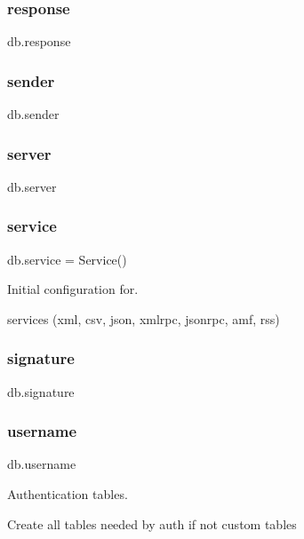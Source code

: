 \subsubsection{\texorpdfstring{response}{response}}
{\footnotesize\ttfamily db.\+response}

\mbox{\label{namespacedb_a0389358465df21506bd70f938441160f}} 
\subsubsection{\texorpdfstring{sender}{sender}}
{\footnotesize\ttfamily db.\+sender}

\mbox{\label{namespacedb_a83850ad9c01b1355d91e442407781570}} 
\subsubsection{\texorpdfstring{server}{server}}
{\footnotesize\ttfamily db.\+server}

\mbox{\label{namespacedb_a60ddb7c313ec8a2276261b95e67ca070}} 
\subsubsection{\texorpdfstring{service}{service}}
{\footnotesize\ttfamily db.\+service = Service()}



Initial configuration for. 

services (xml, csv, json, xmlrpc, jsonrpc, amf, rss) \mbox{\label{namespacedb_ac3b13438d27630fea8f9cbb643fd59f0}} 
\subsubsection{\texorpdfstring{signature}{signature}}
{\footnotesize\ttfamily db.\+signature}

\mbox{\label{namespacedb_a470a73a6c9e7b643e5c6a9ba1b90755e}} 
\subsubsection{\texorpdfstring{username}{username}}
{\footnotesize\ttfamily db.\+username}



Authentication tables. 

Create all tables needed by auth if not custom tables 